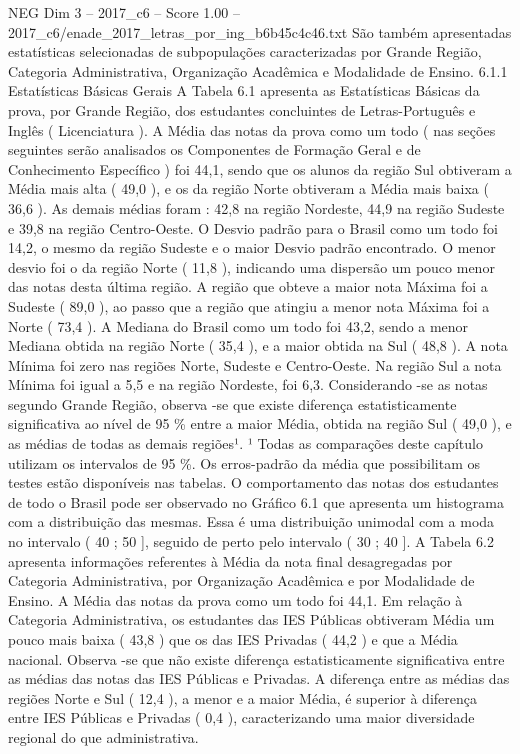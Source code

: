 \begin{textsample}{NEG Dim 3 – 2017\_c6 – Score 1.00 – 2017\_c6/enade\_2017\_letras\_por\_ing\_b6b45c4c46.txt}
São também apresentadas estatísticas selecionadas de subpopulações caracterizadas por Grande Região, Categoria Administrativa, Organização Acadêmica e Modalidade de Ensino. 6.1.1 Estatísticas Básicas Gerais A Tabela 6.1 apresenta as Estatísticas Básicas da prova, por Grande Região, dos estudantes concluintes de Letras-Português e Inglês ( Licenciatura ).
A Média das notas da prova como um todo ( nas seções seguintes serão analisados os Componentes de Formação Geral e de Conhecimento Específico ) foi 44,1, sendo que os alunos da região Sul obtiveram a Média mais alta ( 49,0 ), e os da região Norte obtiveram a Média mais baixa ( 36,6 ).
As demais médias foram : 42,8 na região Nordeste, 44,9 na região Sudeste e 39,8 na região Centro-Oeste.
O Desvio padrão para o Brasil como um todo foi 14,2, o mesmo da região Sudeste e o maior Desvio padrão encontrado.
O menor desvio foi o da região Norte ( 11,8 ), indicando uma dispersão um pouco menor das notas desta última região.
A região que obteve a maior nota Máxima foi a Sudeste ( 89,0 ), ao passo que a região que atingiu a menor nota Máxima foi a Norte ( 73,4 ).
A Mediana do Brasil como um todo foi 43,2, sendo a menor Mediana obtida na região Norte ( 35,4 ), e a maior obtida na Sul ( 48,8 ).
A nota Mínima foi zero nas regiões Norte, Sudeste e Centro-Oeste.
Na região Sul a nota Mínima foi igual a 5,5 e na região Nordeste, foi 6,3.
Considerando -se as notas segundo Grande Região, observa -se que existe diferença estatisticamente significativa ao nível de 95 \% entre a maior Média, obtida na região Sul ( 49,0 ), e as médias de todas as demais regiões¹. ¹ Todas as comparações deste capítulo utilizam os intervalos de 95 \%.
Os erros-padrão da média que possibilitam os testes estão disponíveis nas tabelas.
O comportamento das notas dos estudantes de todo o Brasil pode ser observado no Gráfico 6.1 que apresenta um histograma com a distribuição das mesmas.
Essa é uma distribuição unimodal com a moda no intervalo ( 40 ; 50 ], seguido de perto pelo intervalo ( 30 ; 40 ].
A Tabela 6.2 apresenta informações referentes à Média da nota final desagregadas por Categoria Administrativa, por Organização Acadêmica e por Modalidade de Ensino.
A Média das notas da prova como um todo foi 44,1.
Em relação à Categoria Administrativa, os estudantes das IES Públicas obtiveram Média um pouco mais baixa ( 43,8 ) que os das IES Privadas ( 44,2 ) e que a Média nacional.
Observa -se que não existe diferença estatisticamente significativa entre as médias das notas das IES Públicas e Privadas.
A diferença entre as médias das regiões Norte e Sul ( 12,4 ), a menor e a maior Média, é superior à diferença entre IES Públicas e Privadas ( 0,4 ), caracterizando uma maior diversidade regional do que administrativa.

\end{textsample}
